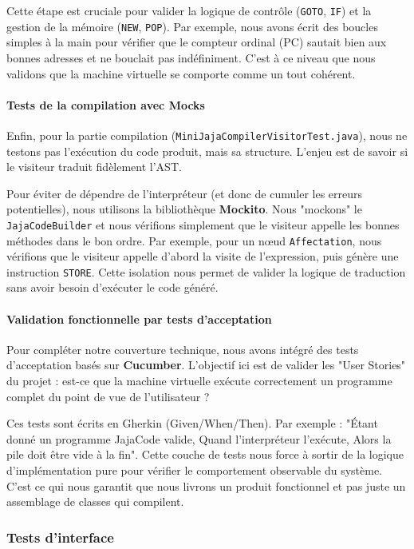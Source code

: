 Cette étape est cruciale pour valider la logique de contrôle (\texttt{GOTO}, \texttt{IF}) et la gestion de la mémoire (\texttt{NEW}, \texttt{POP}). Par exemple, nous avons écrit des boucles simples à la main pour vérifier que le compteur ordinal (PC) sautait bien aux bonnes adresses et ne bouclait pas indéfiniment. C'est à ce niveau que nous validons que la machine virtuelle se comporte comme un tout cohérent.

\paragraph{Tests de la compilation avec Mocks}
Enfin, pour la partie compilation (\texttt{MiniJajaCompilerVisitorTest.java}), nous ne testons pas l'exécution du code produit, mais sa structure. L'enjeu est de savoir si le visiteur traduit fidèlement l'AST.

Pour éviter de dépendre de l'interpréteur (et donc de cumuler les erreurs potentielles), nous utilisons la bibliothèque \textbf{Mockito}. Nous "mockons" le \texttt{JajaCodeBuilder} et nous vérifions simplement que le visiteur appelle les bonnes méthodes dans le bon ordre. Par exemple, pour un nœud \texttt{Affectation}, nous vérifions que le visiteur appelle d'abord la visite de l'expression, puis génère une instruction \texttt{STORE}. Cette isolation nous permet de valider la logique de traduction sans avoir besoin d'exécuter le code généré.

\paragraph{Validation fonctionnelle par tests d'acceptation}
Pour compléter notre couverture technique, nous avons intégré des tests d'acceptation basés sur \textbf{Cucumber}. L'objectif ici est de valider les "User Stories" du projet : est-ce que la machine virtuelle exécute correctement un programme complet du point de vue de l'utilisateur ?

Ces tests sont écrits en Gherkin (Given/When/Then). Par exemple : "Étant donné un programme JajaCode valide, Quand l'interpréteur l'exécute, Alors la pile doit être vide à la fin". Cette couche de tests nous force à sortir de la logique d'implémentation pure pour vérifier le comportement observable du système. C'est ce qui nous garantit que nous livrons un produit fonctionnel et pas juste un assemblage de classes qui compilent.

\subsubsection{Tests d'interface}

